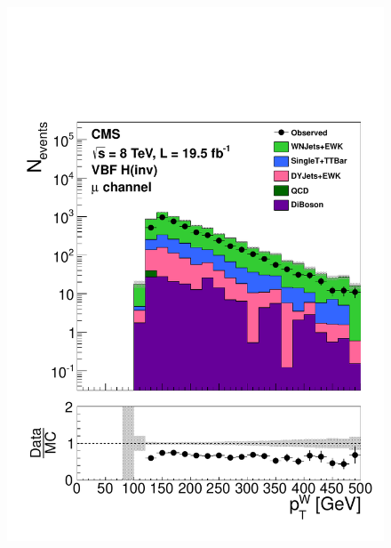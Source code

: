 \begin{figure}
  \includegraphics[width=.6\largefigwidth]{plots/prompt/AN-12-403-figs/hWMu_WpT.pdf}

\end{figure}
